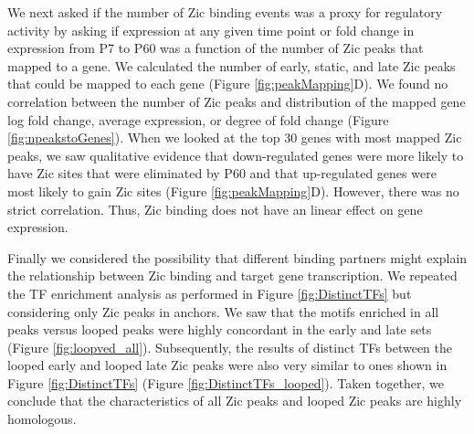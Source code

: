 \documentclass[fleqn,10pt]{wlscirep}
\begin{document}
We next asked if the number of Zic binding events was a proxy for regulatory activity by asking if expression at any given time point or fold change in expression from P7 to P60 was a function of the number of Zic peaks that mapped to a gene. We calculated the number of early, static, and late Zic peaks that could be mapped to each gene (Figure \ref{fig:peakMapping}D). We found no correlation between the number of Zic peaks and distribution of the mapped gene log fold change, average expression, or degree of fold change (Figure \ref{fig:npeakstoGenes}). When we looked at the top 30 genes with most mapped Zic peaks, we saw qualitative evidence that down-regulated genes were more likely to have Zic sites that were eliminated by P60 and that up-regulated genes were most likely to gain Zic sites (Figure \ref{fig:peakMapping}D). However, there was no strict correlation. Thus, Zic binding does not have an linear effect on gene expression.

Finally we considered the possibility that different binding partners might explain the relationship between Zic binding and target gene transcription. We repeated the TF enrichment analysis as performed in Figure \ref{fig:DistinctTFs} but considering only Zic peaks in anchors. We saw that the motifs enriched in all peaks versus looped peaks were highly concordant in the early and late sets (Figure \ref{fig:loopved_all}). Subsequently, the results of distinct TFs between the looped early and looped late Zic peaks were also very similar to ones shown in Figure \ref{fig:DistinctTFs} (Figure \ref{fig:DistinctTFs_looped}). Taken together, we conclude that the characteristics of all Zic peaks and looped Zic peaks are highly homologous.
\end{document}
